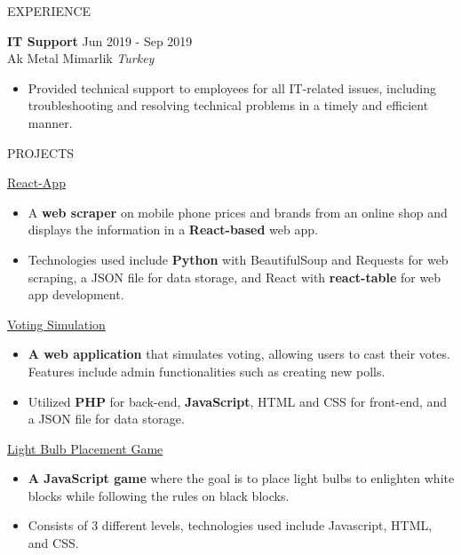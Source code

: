\documentclass{resume} %
\begin{document}
\begin{rSection}{EXPERIENCE}

\textbf{IT Support} \hfill Jun 2019 - Sep 2019\\
Ak Metal Mimarlik \hfill \textit{Turkey}
 \begin{itemize}
    \itemsep -3pt {} 
     \item Provided technical support to employees for all IT-related issues, including troubleshooting and resolving technical problems in a timely and efficient manner.

 \end{itemize}
 

\end{rSection} 



\begin{rSection}{PROJECTS}

\underline{React-App}
 \begin{itemize}
    \itemsep -3pt {} 
     \item A \textbf{web scraper} on mobile phone prices and brands from an online shop and displays the information in a \textbf{React-based} web app. 
     \item Technologies used include \textbf{Python} with BeautifulSoup and Requests for web scraping, a JSON file for data storage, and React with \textbf{react-table} for web app development.
 \end{itemize}

\underline{Voting Simulation}
 \begin{itemize}
    \itemsep -3pt {} 
     \item \textbf{A web application} that simulates voting, allowing users to cast their votes. Features include admin functionalities such as creating new polls. 
     \item Utilized \textbf{PHP} for back-end, \textbf{JavaScript}, HTML and CSS for front-end, and a JSON file for data storage.
 \end{itemize}
\underline{Light Bulb Placement Game}
 \begin{itemize}
    \itemsep -3pt {} 
     \item \textbf{A JavaScript game} where the goal is to place light bulbs to enlighten white blocks while following the rules on black blocks.
     \item Consists of 3 different levels, technologies used include Javascript, HTML, and CSS.
 \end{itemize}


 
\end{rSection} 
\end{document}

